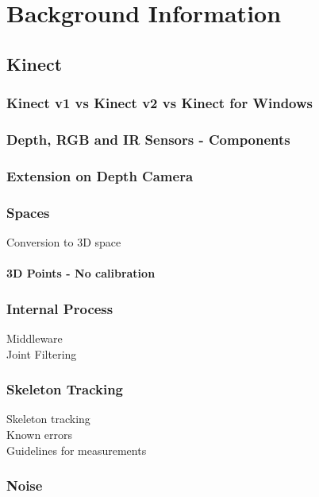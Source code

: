 \section{Background Information}


\subsection{Kinect}

\subsubsection{Kinect v1 vs Kinect v2 vs Kinect for Windows}

\subsubsection{Depth, RGB and IR Sensors - Components}

\subsubsection{Extension on Depth Camera}

\subsubsection{Spaces}
Conversion to 3D space \cite{nonContact2017}\\

\paragraph{3D Points - No calibration}

\subsubsection{Internal Process}
Middleware \cite{nonContact2017}\\
Joint Filtering\\

\subsubsection{Skeleton Tracking}
Skeleton tracking\\
Known errors\\
Guidelines for measurements\\

\subsubsection{Noise}




